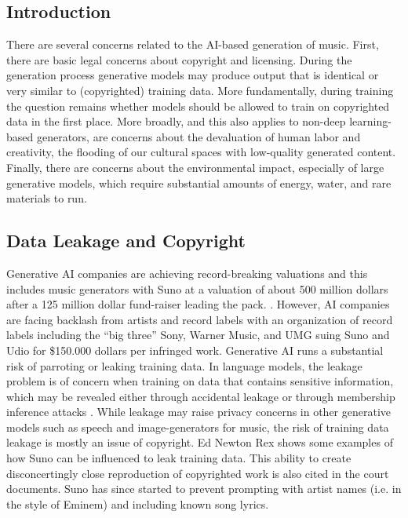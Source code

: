 \subsection{Introduction}
There are several concerns related to the AI-based generation of music. First, there are basic legal concerns about copyright and licensing. During the generation process generative models may produce output that is identical or very similar to (copyrighted) training data. More fundamentally, during training the question remains whether models should be allowed to train on copyrighted data in the first place. More broadly, and this also applies to non-deep learning-based generators, are concerns about the devaluation of human labor and creativity, the flooding of our cultural spaces with low-quality generated content. Finally, there are concerns about the environmental impact, especially of large generative models, which require substantial amounts of energy, water, and rare materials to run. 

\subsection{Data Leakage and Copyright}
Generative AI companies are achieving record-breaking valuations and this includes music generators with Suno at a valuation of about 500 million dollars after a 125  million dollar fund-raiser leading the pack. \cite{Stassen_2024} \cite{Tencer_2024}. However, AI companies are facing backlash from artists and record labels with an organization of record labels including the  “big three” Sony, Warner Music, and UMG suing Suno and Udio for \$150.000 dollars per infringed work\cite{Kaba_River_Perry_2024}.  Generative AI runs a substantial risk of parroting or leaking training data. In language models, the leakage problem is of concern when training on data that contains sensitive information, which may be revealed either through accidental leakage or through membership inference attacks \cite{Duan_Suri_Mireshghallah_Min_Shi_Zettlemoyer_Tsvetkov_Choi_Evans_Hajishirzi_2024}. While leakage may raise privacy concerns in other generative models such as speech and image-generators \cite{Carlini_Hayes_Nasr_Jagielski_Sehwag_Tramèr_Balle_Ippolito_Wallace_2023} for music, the risk of training data leakage is mostly an issue of copyright. Ed Newton Rex shows some examples of how Suno can be influenced \cite{Newton-Rex_2024} to leak training data. This ability to create disconcertingly close reproduction of copyrighted work is also cited in the court documents. Suno has since started to prevent prompting with artist names (i.e. in the style of Eminem) and including known song lyrics. 

